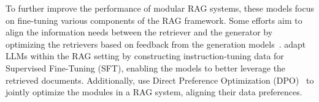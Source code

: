 To further improve the performance of modular RAG systems, these models focus on fine-tuning various components of the RAG framework. Some efforts aim to align the information needs between the retriever and the generator by optimizing the retrievers based on feedback from the generation models~\cite{yu2023augmentation, shi-etal-2024-replug, izacard2021distilling}. \citet{lin2024radit} adapt LLMs within the RAG setting by constructing instruction-tuning data for Supervised Fine-Tuning (SFT), enabling the models to better leverage the retrieved documents. Additionally, \citet{li2024rag} use Direct Preference Optimization (DPO)~\cite{rafailov2024direct} to jointly optimize the modules in a RAG system, aligning their data preferences.






